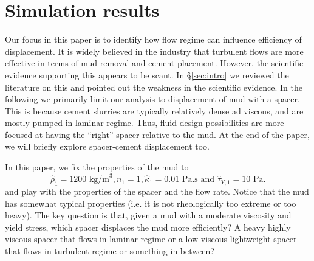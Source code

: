 \documentclass[review]{elsarticle}
\newlength{\Oldarrayrulewidth}
\newcommand{\tline}[1]{%
  \noalign{\global\setlength{\Oldarrayrulewidth}{\arrayrulewidth}}%
  \noalign{\global\setlength{\arrayrulewidth}{1pt}}\cline{#1}%
  \noalign{\global\setlength{\arrayrulewidth}{\Oldarrayrulewidth}}}
\begin{document}
%
%             

\section{Simulation results}
Our focus in this paper is to identify how flow regime can influence efficiency of displacement. It is widely believed in the industry that turbulent flows are more effective in terms of mud removal and cement placement. However, the scientific evidence supporting this appears to be scant. In \S \ref{sec:intro} we reviewed the literature on this and pointed out the weakness in the scientific evidence. In the following we primarily limit our analysis to displacement of mud with a spacer. This is because cement slurries are typically relatively dense ad viscous, and are mostly pumped in laminar regime. Thus, fluid design possibilities are more focused at having the ``right'' spacer relative to the mud. At the end of the paper, we will briefly explore spacer-cement displacement too. 

In this paper, we fix the properties of the mud to 
%
\begin{equation}\label{eq:mud_prop}
\hat \rho_1 = 1200 \text{ kg/m}^3, n_1 = 1, \hat \kappa_1 = 0.01 \text{ Pa.s and } \hat \tau_{Y,1} =10\text{ Pa.}
\end{equation} 
%
and play with the properties of the spacer and the flow rate. Notice that the mud has somewhat typical properties (i.e. it is not rheologically too extreme or too heavy). The key question is that, given a mud with a moderate viscosity and yield stress, which spacer displaces the mud more efficiently? A heavy highly viscous spacer that flows in laminar regime or a low viscous lightweight spacer that flows in turbulent regime or something in between?
\end{document}
